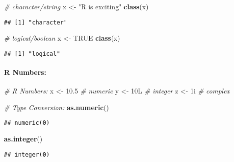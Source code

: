 \documentclass[
]{article}
\newenvironment{Shaded}{\begin{snugshade}}{\end{snugshade}}
\newcommand{\CommentTok}[1]{\textcolor[rgb]{0.56,0.35,0.01}{\textit{#1}}}
\newcommand{\ConstantTok}[1]{\textcolor[rgb]{0.56,0.35,0.01}{#1}}
\newcommand{\FloatTok}[1]{\textcolor[rgb]{0.00,0.00,0.81}{#1}}
\newcommand{\FunctionTok}[1]{\textcolor[rgb]{0.13,0.29,0.53}{\textbf{#1}}}
\newcommand{\NormalTok}[1]{#1}
\newcommand{\OtherTok}[1]{\textcolor[rgb]{0.56,0.35,0.01}{#1}}
\newcommand{\StringTok}[1]{\textcolor[rgb]{0.31,0.60,0.02}{#1}}
\begin{document}
\begin{Shaded}
\begin{Highlighting}[]
\CommentTok{\# character/string}
\NormalTok{x }\OtherTok{\textless{}{-}} \StringTok{"R is exciting"}
\FunctionTok{class}\NormalTok{(x)}
\end{Highlighting}
\end{Shaded}

\begin{verbatim}
## [1] "character"
\end{verbatim}

\begin{Shaded}
\begin{Highlighting}[]
\CommentTok{\# logical/boolean}
\NormalTok{x }\OtherTok{\textless{}{-}} \ConstantTok{TRUE}
\FunctionTok{class}\NormalTok{(x)}
\end{Highlighting}
\end{Shaded}

\begin{verbatim}
## [1] "logical"
\end{verbatim}

\hypertarget{r-numbers}{%
\paragraph{R Numbers:}\label{r-numbers}}

\begin{Shaded}
\begin{Highlighting}[]
\CommentTok{\# R Numbers:}
\NormalTok{x }\OtherTok{\textless{}{-}} \FloatTok{10.5}   \CommentTok{\# numeric}
\NormalTok{y }\OtherTok{\textless{}{-}}\NormalTok{ 10L    }\CommentTok{\# integer}
\NormalTok{z }\OtherTok{\textless{}{-}}\NormalTok{ 1i     }\CommentTok{\# complex}

\CommentTok{\# Type Conversion:}
\FunctionTok{as.numeric}\NormalTok{()}
\end{Highlighting}
\end{Shaded}

\begin{verbatim}
## numeric(0)
\end{verbatim}

\begin{Shaded}
\begin{Highlighting}[]
\FunctionTok{as.integer}\NormalTok{()}
\end{Highlighting}
\end{Shaded}

\begin{verbatim}
## integer(0)
\end{verbatim}
\end{document}
